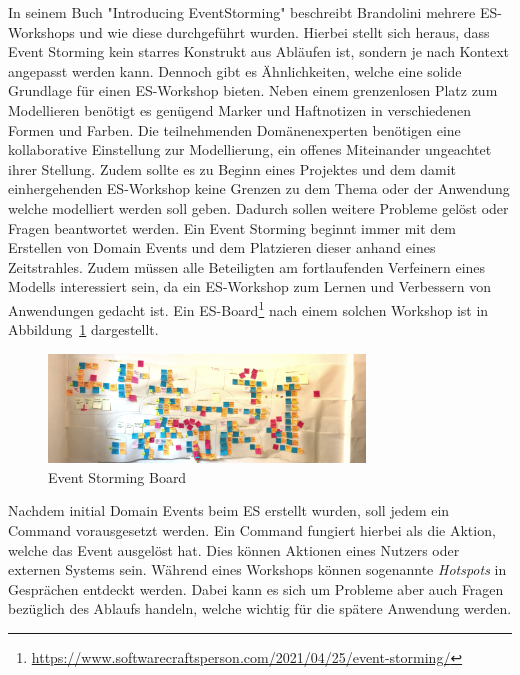 In seinem Buch "Introducing EventStorming" beschreibt Brandolini mehrere \ac{ES}-Workshops und wie diese durchgeführt wurden.\cite*{introES}
Hierbei stellt sich heraus, dass Event Storming kein starres Konstrukt aus Abläufen ist, sondern je nach Kontext angepasst werden kann.
Dennoch gibt es Ähnlichkeiten, welche eine solide Grundlage für einen \ac{ES}-Workshop bieten\cite*{introES}.
Neben einem grenzenlosen Platz zum Modellieren benötigt es genügend Marker und Haftnotizen in verschiedenen Formen und Farben.
Die teilnehmenden Domänenexperten benötigen eine kollaborative Einstellung zur Modellierung, ein offenes Miteinander ungeachtet ihrer Stellung.
Zudem sollte es zu Beginn eines Projektes und dem damit einhergehenden \ac{ES}-Workshop keine Grenzen zu dem Thema oder der Anwendung welche modelliert werden soll geben.
Dadurch sollen weitere Probleme gelöst oder Fragen beantwortet werden.
Ein Event Storming beginnt immer mit dem Erstellen von Domain Events und dem Platzieren dieser anhand eines Zeitstrahles.
Zudem müssen alle Beteiligten am fortlaufenden Verfeinern eines Modells interessiert sein, da ein \ac{ES}-Workshop zum Lernen und Verbessern
von Anwendungen gedacht ist.
Ein \ac{ES}-Board\footnote{\url{https://www.softwarecraftsperson.com/2021/04/25/event-storming/}}
nach einem solchen Workshop ist in Abbildung~\ref{fig:rlBoard} dargestellt.

\begin{figure}[ht]
    \centering
    \includegraphics[width=0.75\textwidth]{images/2.1/event-storming}
    \caption{Event Storming Board}
    \label{fig:rlBoard}
\end{figure}

Nachdem initial Domain Events beim \ac{ES} erstellt wurden, soll jedem ein Command vorausgesetzt werden.
Ein Command fungiert hierbei als die Aktion, welche das Event ausgelöst hat.
Dies können Aktionen eines Nutzers oder externen Systems sein.
Während eines Workshops können sogenannte \textit{Hotspots} in Gesprächen entdeckt werden.
Dabei kann es sich um Probleme aber auch Fragen bezüglich des Ablaufs handeln, welche wichtig für die spätere Anwendung werden.

